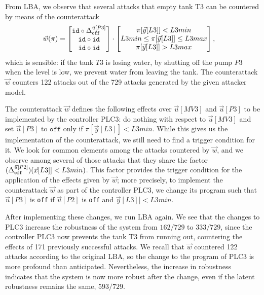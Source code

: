 {From LBA, we observe that several attacks that empty tank T3 can be countered by means of the counterattack 
\begin{align*}
    \vec{w}(\pi)&=
    \begin{bmatrix}
    {\texttt{id}}\circ {\Delta}^{\vec{u}[P3]}_{\texttt{off}} \\
     {\texttt{id}}\circ {\texttt{id}} \\
     {\texttt{id}}\circ {\texttt{id}} \\
    \end{bmatrix}
    \cdot
    \begin{bmatrix}
      \pi[\vec{y}[L3]]<L3min \\
      L3min \leq \pi[\vec{y}[L3]]\leq L3max \\
      \pi[\vec{y}[L3]]>L3max
    \end{bmatrix},
  \end{align*} 
which is sensible: if the tank $T3$ is losing water, by shutting off the pump $P3$ when the level is low, we prevent water from leaving the tank. The counterattack $\vec{w}$ counters 122 attacks out of the 729 attacks generated by the given attacker model.

The counterattack $\vec{w}$ defines the following effects over $\vec{u}[MV3]$ and $\vec{u}[P3]$ to be implemented by the controller PLC3: do nothing with respect to $\vec{u}[MV3]$ and set $\vec{u}[P3]$ to $\texttt{off}$ only if $\pi[\vec{y}[L3]]<L3min$. While this gives us the implementation of the counterattack, we still need to find a trigger condition for it. We look for common elements among the attacks countered by $\vec{w}$, and we observe among several of those attacks that they share the factor $({\Delta}^{\vec{u}[P2]}_{\texttt{off}})(\vec{x}[L3]]<L3min)$. This factor provides the trigger condition for the application of the effects given by $\vec{w}$; more precisely, to implement the counterattack $\vec{w}$ as part of the controller PLC3, we change its program such that $\vec{u}[P3]$ is \texttt{off} if $\vec{u}[P2]$ is \texttt{off} and $\vec{y}[L3]]<L3min$. 

After implementing these changes, we run LBA again. We see that the changes to PLC3 increase the robustness of the system from $162/729$ to $333/729$, since the controller PLC3 now prevents the tank T3 from running out, countering the effects of 171 previously successful attacks. We recall that $\vec{w}$ countered 122 attacks according to the original LBA, so the change to the program of PLC3 is more profound than anticipated. Nevertheless, the increase in robustness indicates that the system is now more robust after the change, even if the latent robustness remains the same, $593/729$. 

}
